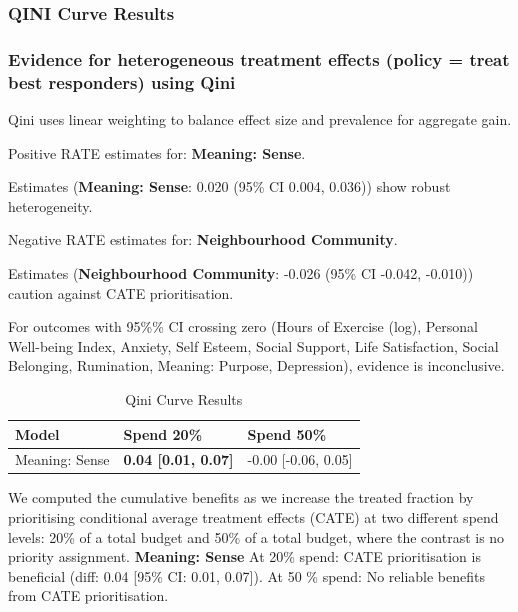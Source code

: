 \documentclass[
  single column]{article}
\begin{document}
\subsubsection{QINI Curve Results}\label{qini-curve-results}

\subsubsection{Evidence for heterogeneous treatment effects (policy =
treat best responders) using
Qini}\label{evidence-for-heterogeneous-treatment-effects-policy-treat-best-responders-using-qini}

Qini uses linear weighting to balance effect size and prevalence for
aggregate gain.

Positive RATE estimates for: \textbf{Meaning: Sense}.

Estimates (\textbf{Meaning: Sense}: 0.020 (95\% CI 0.004, 0.036)) show
robust heterogeneity.

Negative RATE estimates for: \textbf{Neighbourhood Community}.

Estimates (\textbf{Neighbourhood Community}: -0.026 (95\% CI -0.042,
-0.010)) caution against CATE prioritisation.

For outcomes with 95\%\% CI crossing zero (Hours of Exercise (log),
Personal Well-being Index, Anxiety, Self Esteem, Social Support, Life
Satisfaction, Social Belonging, Rumination, Meaning: Purpose,
Depression), evidence is inconclusive.

\begin{longtable}[]{@{}lll@{}}

\caption{\label{tbl-qini}Qini Curve Results}

\tabularnewline

\toprule\noalign{}
Model & Spend 20\% & Spend 50\% \\
\midrule\noalign{}
\endhead
\bottomrule\noalign{}
\endlastfoot
Meaning: Sense & \textbf{0.04 {[}0.01, 0.07{]}} & -0.00 {[}-0.06,
0.05{]} \\

\end{longtable}

We computed the cumulative benefits as we increase the treated fraction
by prioritising conditional average treatment effects (CATE) at two
different spend levels: 20\% of a total budget and 50\% of a total
budget, where the contrast is no priority assignment. \textbf{Meaning:
Sense} At 20\% spend: CATE prioritisation is beneficial (diff: 0.04
{[}95\% CI: 0.01, 0.07{]}). At 50 \% spend: No reliable benefits from
CATE prioritisation.
\end{document}
